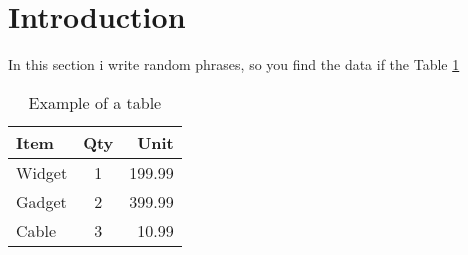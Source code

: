 \documentclass{article}
\begin{document}
\section{Introduction}
In this section i write random phrases, so you find the data if the Table \ref{tab:example}
	
	\begin{table}[!h]
		\centering
		\caption{Example of a table}
		\label{tab:example}
		\begin{tabular}{|l|c|r|} %
			\hline %
			Item & Qty & Unit \\ %
			\hline
			Widget & 1 & 199.99 \\
			\hline
			Gadget & 2 & 399.99 \\
			\hline
			Cable & 3 & 10.99 \\
			\hline
		\end{tabular}
	\end{table}
\end{document}
